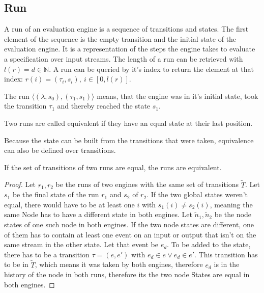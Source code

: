 \subsection{Run}
\label{sec:concepts:def:run}

A run of an evaluation engine is a sequence of transitions and states.
The first element of the sequence is the empty transition and the initial state of the evaluation engine.
It is a representation of the steps the engine takes to evaluate a specification over input streams.
The length of a run can be retrieved with \(l(r) = d \in \mathbb{N}\).
A run can be queried by it's index to return the element at that index: \(r(i)=(\tau_i, s_i),\ i \in [0, l(r)]\).

The run \(\langle (\lambda, s_0), (\tau_1, s_1) \rangle\) means, that the engine was in it's initial state, took the transition \(\tau_1\) and thereby reached the state \(s_1\).

\begin{definition}[name = Equivalence of Runs]\label{def:equivalence_runs}
  Two runs are called equivalent if they have an equal state at their last position.
\end{definition}

Because the state can be built from the transitions that were taken, equivalence can also be defined over transitions.

\begin{lemma}[name = Equivalence of Runs over Transitions]\label{lemma:equivalent_runs_with_transitions}
  If the set of transitions of two runs are equal, the runs are equivalent.
\end{lemma}

\begin{proof}
  Let \(r_1, r_2\) be the runs of two engines with the same set of transitions \(\widetilde{T}\).
  Let \(s_1\) be the final state of the run \(r_1\) and \(s_2\) of \(r_2\).
  If the two global states weren't equal, there would have to be at least one \(i\) with \(s_1(i) \neq s_2(i)\), meaning the same Node has to have a different state in both engines.
  Let \(\widetilde{n}_1, \widetilde{n}_2\) be the node states of one such node in both engines.
  If the two node states are different, one of them has to contain at least one event on an input or output that isn't on the same stream in the other state.
  Let that event be \(e_d\).
  To be added to the state, there has to be a transition \(\tau = (e, e')\) with \(e_d \in e \lor e_d \in e'\).
  This transition has to be in \(\widetilde{T}\), which means it was taken by both engines, therefore \(e_d\) is in the history of the node in both runs, therefore its the two node States are equal in both engines.
\end{proof}

